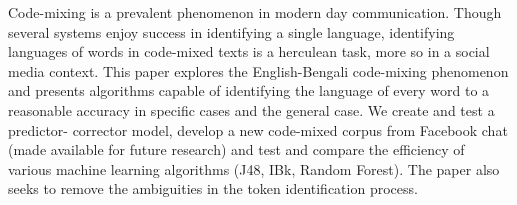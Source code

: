 Code-mixing is a prevalent phenomenon in modern day communication. Though several systems enjoy success in identifying a single language, identifying languages of words in code-mixed texts is a herculean task, more so in a social media context. This paper explores the English-Bengali code-mixing phenomenon and presents algorithms capable of identifying the language of every word to a reasonable accuracy in specific cases and the general case. We create and test a predictor- corrector model, develop a new code-mixed corpus from Facebook chat (made available for future research) and test and compare the efficiency of various machine learning algorithms (J48, IBk, Random Forest). The paper also seeks to remove the ambiguities in the token identification process.
